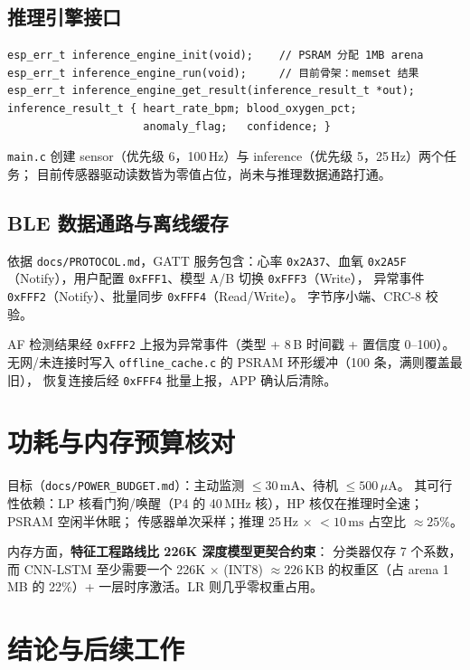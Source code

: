 \documentclass[11pt,a4paper]{ctexart}
\newcommand{\feat}[1]{\texttt{#1}}
\begin{document}
\subsection{推理引擎接口}
\label{sec:engine}

\begin{verbatim}
esp_err_t inference_engine_init(void);    // PSRAM 分配 1MB arena
esp_err_t inference_engine_run(void);     // 目前骨架：memset 结果
esp_err_t inference_engine_get_result(inference_result_t *out);
inference_result_t { heart_rate_bpm; blood_oxygen_pct;
                     anomaly_flag;   confidence; }
\end{verbatim}

\feat{main.c} 创建 sensor（优先级 6，100\,Hz）与 inference（优先级 5，25\,Hz）两个任务；
目前传感器驱动读数皆为零值占位，尚未与推理数据通路打通。

\subsection{BLE 数据通路与离线缓存}
\label{sec:ble}

依据 \feat{docs/PROTOCOL.md}，GATT 服务包含：心率 \feat{0x2A37}、血氧 \feat{0x2A5F}
（Notify），用户配置 \feat{0xFFF1}、模型 A/B 切换 \feat{0xFFF3}（Write），
异常事件 \feat{0xFFF2}（Notify）、批量同步 \feat{0xFFF4}（Read/Write）。
字节序小端、CRC-8 校验。

AF 检测结果经 \feat{0xFFF2} 上报为异常事件（类型 + 8\,B 时间戳 + 置信度 0--100）。
无网/未连接时写入 \feat{offline\_cache.c} 的 PSRAM 环形缓冲（100 条，满则覆盖最旧），
恢复连接后经 \feat{0xFFF4} 批量上报，APP 确认后清除。

\section{功耗与内存预算核对}
\label{sec:budget-check}

目标（\feat{docs/POWER\_BUDGET.md}）：主动监测 $\le30\,\mathrm{mA}$、待机 $\le500\,\mu\mathrm{A}$。
其可行性依赖：LP 核看门狗/唤醒（P4 的 40\,MHz 核），HP 核仅在推理时全速；PSRAM 空闲半休眠；
传感器单次采样；推理 25\,Hz $\times$ $<10\,\mathrm{ms}$ 占空比 $\approx 25\%$。

内存方面，\textbf{特征工程路线比 226K 深度模型更契合约束}：
分类器仅存 7 个系数，而 CNN-LSTM 至少需要一个 226K $\times$ (INT8) $\approx 226\,\mathrm{KB}$
的权重区（占 arena 1\,MB 的 22\%）+ 一层时序激活。LR 则几乎零权重占用。

\section{结论与后续工作}
\label{sec:conclusion}
\end{document}
